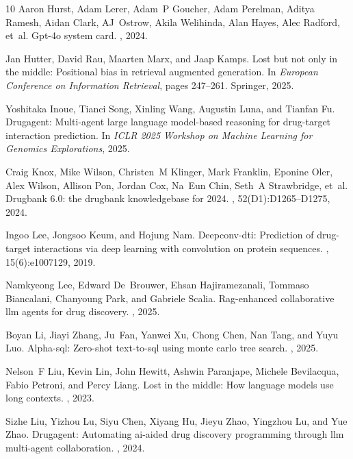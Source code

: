 \documentclass[letterpaper,twocolumn,10pt]{llncs}
\begin{document}
\begin{thebibliography}{10}
Aaron Hurst, Adam Lerer, Adam~P Goucher, Adam Perelman, Aditya Ramesh, Aidan Clark, AJ~Ostrow, Akila Welihinda, Alan Hayes, Alec Radford, et~al.
\newblock Gpt-4o system card.
, 2024.

Jan Hutter, David Rau, Maarten Marx, and Jaap Kamps.
\newblock Lost but not only in the middle: Positional bias in retrieval augmented generation.
\newblock In {\em European Conference on Information Retrieval}, pages 247--261. Springer, 2025.

Yoshitaka Inoue, Tianci Song, Xinling Wang, Augustin Luna, and Tianfan Fu.
\newblock Drugagent: Multi-agent large language model-based reasoning for drug-target interaction prediction.
\newblock In {\em ICLR 2025 Workshop on Machine Learning for Genomics Explorations}, 2025.

Craig Knox, Mike Wilson, Christen~M Klinger, Mark Franklin, Eponine Oler, Alex Wilson, Allison Pon, Jordan Cox, Na~Eun Chin, Seth~A Strawbridge, et~al.
\newblock Drugbank 6.0: the drugbank knowledgebase for 2024.
, 52(D1):D1265--D1275, 2024.

Ingoo Lee, Jongsoo Keum, and Hojung Nam.
\newblock Deepconv-dti: Prediction of drug-target interactions via deep learning with convolution on protein sequences.
, 15(6):e1007129, 2019.

Namkyeong Lee, Edward De~Brouwer, Ehsan Hajiramezanali, Tommaso Biancalani, Chanyoung Park, and Gabriele Scalia.
\newblock Rag-enhanced collaborative llm agents for drug discovery.
, 2025.

Boyan Li, Jiayi Zhang, Ju~Fan, Yanwei Xu, Chong Chen, Nan Tang, and Yuyu Luo.
\newblock Alpha-sql: Zero-shot text-to-sql using monte carlo tree search.
, 2025.

Nelson~F Liu, Kevin Lin, John Hewitt, Ashwin Paranjape, Michele Bevilacqua, Fabio Petroni, and Percy Liang.
\newblock Lost in the middle: How language models use long contexts.
, 2023.

Sizhe Liu, Yizhou Lu, Siyu Chen, Xiyang Hu, Jieyu Zhao, Yingzhou Lu, and Yue Zhao.
\newblock Drugagent: Automating ai-aided drug discovery programming through llm multi-agent collaboration.
, 2024.


\end{thebibliography}
\end{document}
